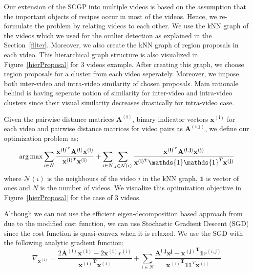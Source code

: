 Our extension of the SCGP into multiple videos is based on the assumption that the important objects of recipes occur in most of the videos. Hence, we re-formulate the problem by relating videos to each other. We use the kNN graph of the videos which we used for the outlier detection as explained in the Section~\ref{filter}. Moreover, we also create the kNN graph of region proposals in each video. This hierarchical graph structure is also visualized in Figure~\ref{hierProposal} for 3 videos example. After creating this graph, we choose region proposals for a cluster from each video seperately. Moreover, we impose both inter-video and intra-video similarity of chosen proposals. Main rationale behind is having seperate notion of similarity for inter-video and intra-video clusters since their visual similarity decreases drastically for intra-video case.

Given the pairwise distance matrices $\mathbf{A^{(i)}}$, binary indicator vectors $\mathbf{x^{(i)}}$ for each video and pairwise distance matrices for video pairs as $\mathbf{A^{(i,j)}}$, we define our optimization problem as;
\begin{equation}
\argmax \sum_{i \in N} \frac{\mathbf{x^{(i)^T}}\mathbf{A^{(i)}}\mathbf{x^{(i)}}}{\mathbf{x^{(i)^T}}\mathbf{x^{(i)}}} +
\sum_{i \in N} \sum_{j \in \mathcal{N}(i)} \frac{\mathbf{x^{(i)^T}}\mathbf{A^{(i,j)}}\mathbf{x^{(j)}}} {\mathbf{x^{(i)^T}}\mathds{1}\mathds{1}^T\mathbf{x^{(j)}}}
\end{equation}
where $\mathcal{N}(i)$ is the neighbours of the video $i$ in the kNN graph, $\mathds{1}$ is vector of ones and $N$ is the number of videos. We visualize this optimization objective in Figure~\ref{hierProposal} for the case of 3 videos.

Although we can not use the efficient eigen-decomposition based approach from \cite{scgp,scgp_eigen} due to the modified cost function, we can use Stochastic Gradient Descent (SGD) since the cost function is quasi-convex when it is relaxed. We use the SGD with the following analytic gradient function;
\begin{equation}
  \nabla_{\mathbf{x^{(i)}}} = \frac{2\mathbf{A^{(i)}} \mathbf{x^{(i)}} -2\mathbf{x^{(i)}} r^{(i)}}
  {\mathbf{{x^{(i)}}^T}\mathbf{x^{(i)}}}
+ \sum_{i \in N} \frac{\mathbf{A^{i,j}}\mathbf{x^{j}} - \mathbf{{x^{(j)}}^T} \mathds{1} r^{(i,j)}}{\mathbf{{x^{(i)}}^T} \mathds{1} \mathds{1}^T \mathbf{x^{(j)}} }
\end{equation}

